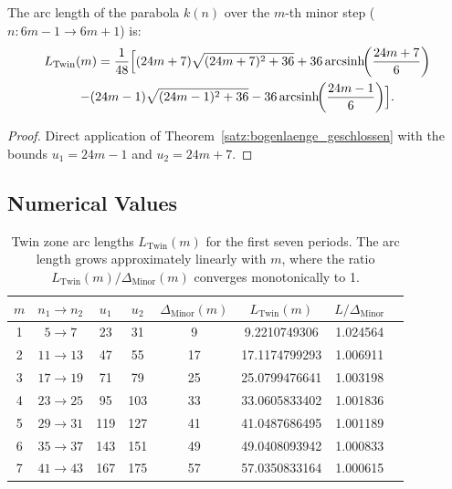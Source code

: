 \begin{satz}\label{satz:twin_zone}
The arc length of the parabola $k(n)$ over the $m$-th minor step
($n: 6m-1 \to 6m+1$) is:
\begin{multline}
  L_{\mathrm{Twin}}(m)
  = \frac{1}{48}\Bigl[
      (24m+7)\sqrt{(24m+7)^2+36}
    + 36\operatorname{arcsinh}\!\!\left(\frac{24m+7}{6}\right)
    \\
    - (24m-1)\sqrt{(24m-1)^2+36}
    - 36\operatorname{arcsinh}\!\!\left(\frac{24m-1}{6}\right)
    \Bigr].
\end{multline}
\end{satz}

\begin{proof}
Direct application of Theorem~\ref{satz:bogenlaenge_geschlossen} with the bounds
$u_1 = 24m-1$ and $u_2 = 24m+7$.
\end{proof}

\subsection{Numerical Values}

\begin{table}[H]
\centering
\caption{Twin zone arc lengths $L_{\mathrm{Twin}}(m)$ for the first
  seven periods. The arc length grows approximately linearly with $m$,
  where the ratio $L_{\mathrm{Twin}}(m) / \Delta_{\mathrm{Minor}}(m)$
  converges monotonically to 1.}
\renewcommand{\arraystretch}{1.2}
\begin{tabular}{cccccccc}
\toprule
$m$ & $n_1 \to n_2$ & $u_1$ & $u_2$ &
$\Delta_{\mathrm{Minor}}(m)$ & $L_{\mathrm{Twin}}(m)$ &
$L / \Delta_{\mathrm{Minor}}$ \\
\midrule
1 &  $5 \to  7$ & 23 &  31 &  9 &  9.2210749306 & 1.024564 \\
2 & $11 \to 13$ & 47 &  55 & 17 & 17.1174799293 & 1.006911 \\
3 & $17 \to 19$ & 71 &  79 & 25 & 25.0799476641 & 1.003198 \\
4 & $23 \to 25$ & 95 & 103 & 33 & 33.0605833402 & 1.001836 \\
5 & $29 \to 31$ & 119 & 127 & 41 & 41.0487686495 & 1.001189 \\
6 & $35 \to 37$ & 143 & 151 & 49 & 49.0408093942 & 1.000833 \\
7 & $41 \to 43$ & 167 & 175 & 57 & 57.0350833164 & 1.000615 \\
\bottomrule
\end{tabular}
\end{table}

